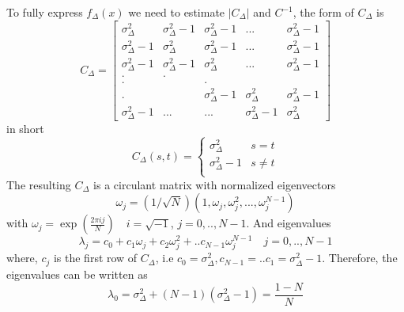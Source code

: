 \documentclass{report}
\begin{document}
To fully express $f_\Delta(x)$ we need to estimate $|C_\Delta|$ and $C^{-1}$, the form of $C_\Delta$ is 
\begin{equation*}
C_\Delta = \left[
\begin{matrix}
\sigma^2_{\Delta}     & \sigma^2_{\Delta}-1 & \sigma^2_{\Delta}-1 & ...                 & \sigma^2_{\Delta}-1 \\
\sigma^2_{\Delta}-1   &\sigma^2_{\Delta}    & \sigma^2_{\Delta}-1 & ...                 & \sigma^2_{\Delta}-1 \\
\sigma^2_{\Delta}-1   & \sigma^2_{\Delta}-1 & \sigma^2_{\Delta}   & ...                 & \sigma^2_{\Delta}-1 \\
.                     &    .                &                     &                     &      \\
.                     &                     &  .                  &                     &      \\
.                     &                     & \sigma^2_{\Delta}-1 & \sigma^2_{\Delta}   & \sigma^2_{\Delta}-1  \\
\sigma^2_{\Delta}-1   & ...                 &...                  & \sigma^2_{\Delta}-1 & \sigma^2_{\Delta}
\end{matrix}
\right]
\end{equation*}
in short
\begin{equation*}
C_\Delta(s,t)=
\begin{cases}
\sigma^2_\Delta & s=t\\
\sigma^2_\Delta-1 & s\neq t\\
\end{cases}
\end{equation*}
The resulting $C_\Delta$ is a circulant matrix with normalized eigenvectors
\begin{equation*}
\omega_j = (1/\sqrt{N})(1,\omega_j,\omega_j^2,...,\omega_j^{N-1})
\end{equation*}
with $\omega_j = \exp(\frac{2\pi ij}{N}) \quad i=\sqrt{-1}$, $j=0,..,N-1$. And eigenvalues
\begin{equation*}
\lambda_j = c_0 +c_1\omega_j +c_2\omega_j^2 +..c_{N-1}\omega_j^{N-1} \quad j=0,..,N-1
\end{equation*}
where, $c_j$ is the first row of $C_\Delta$, i.e $c_0=\sigma^2_{\Delta} , c_{N-1}=..c_1=\sigma^2_{\Delta} -1$. Therefore, the eigenvalues can be written as 
\begin{equation*}
\lambda_0 =  \sigma^2_{\Delta}+(N-1)( \sigma^2_{\Delta}-1)=\frac{1-N}{N}
\end{equation*}
\end{document}
